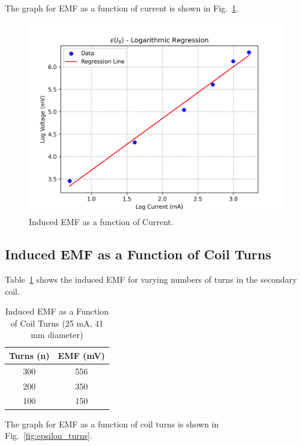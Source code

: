 \documentclass[journal]{IEEEtran}
\begin{document}
The graph for EMF as a function of current is shown in Fig.~\ref{fig:epsilon_current}.

\begin{figure}[H]
    \centering
    \includegraphics[width=0.9\linewidth]{output_plots/epsilonI_0.png}
    \caption{Induced EMF as a function of Current.}
    \label{fig:epsilon_current}
\end{figure}

\subsection{Induced EMF as a Function of Coil Turns}
Table~\ref{tab:emf_turns} shows the induced EMF for varying numbers of turns in the secondary coil.

\begin{table}[H]
    \centering
    \caption{Induced EMF as a Function of Coil Turns (25 mA, 41 mm diameter)}
    \begin{tabular}{cc}
        \hline
        Turns (n) & EMF (mV) \\ \hline
        300 & 556 \\
        200 & 350 \\ 
        100 & 150 \\\hline
    \end{tabular}
    \label{tab:emf_turns}
\end{table}

The graph for EMF as a function of coil turns is shown in Fig.~\ref{fig:epsilon_turns}.
\end{document}
